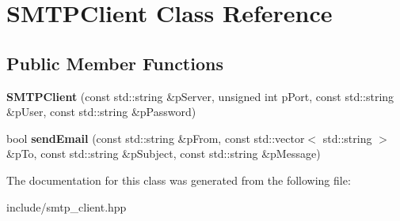 \hypertarget{classSMTPClient}{}\section{S\+M\+T\+P\+Client Class Reference}
\label{classSMTPClient}
\subsection*{Public Member Functions}
\begin{DoxyCompactItemize}
\item 
{\bfseries S\+M\+T\+P\+Client} (const std\+::string \&p\+Server, unsigned int p\+Port, const std\+::string \&p\+User, const std\+::string \&p\+Password)\hypertarget{classSMTPClient_af78f383761a38a6ddbe3eb1454645530}{}\label{classSMTPClient_af78f383761a38a6ddbe3eb1454645530}

\item 
bool {\bfseries send\+Email} (const std\+::string \&p\+From, const std\+::vector$<$ std\+::string $>$ \&p\+To, const std\+::string \&p\+Subject, const std\+::string \&p\+Message)\hypertarget{classSMTPClient_ac79a9db8724eb494ea1d67bdb0bc1cd2}{}\label{classSMTPClient_ac79a9db8724eb494ea1d67bdb0bc1cd2}

\end{DoxyCompactItemize}


The documentation for this class was generated from the following file\+:\begin{DoxyCompactItemize}
\item 
include/smtp\+\_\+client.\+hpp\end{DoxyCompactItemize}
